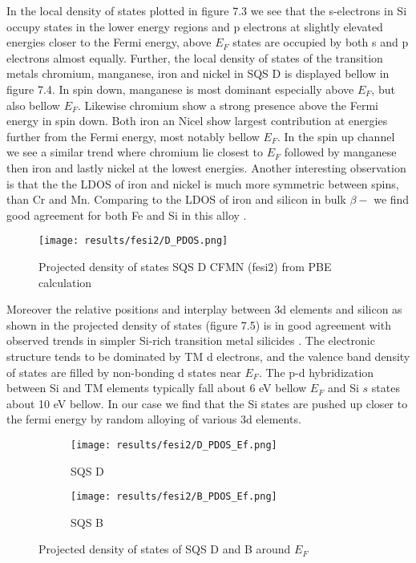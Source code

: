In the local density of states plotted in figure 7.3 we see that the s-electrons in Si occupy states in the lower energy regions and p electrons at slightly elevated energies closer to the Fermi energy, above $E_F$ states are occupied by both s and p electrons almost equally. Further, the local density of states of the transition metals chromium, manganese, iron and nickel in SQS D is displayed bellow in figure 7.4. In spin down, manganese is most dominant especially above $E_F$, but also bellow $E_F$. Likewise chromium show a strong presence above the Fermi energy in spin down. Both iron an Nicel show largest contribution at energies further from the Fermi energy, most notably bellow $E_F$. In the spin up channel we see a similar trend where chromium lie closest to $E_F$ followed by manganese then iron and lastly nickel at the lowest energies. Another interesting observation is that the the LDOS of iron and nickel is much more symmetric between spins, than Cr and Mn. Comparing to the LDOS of iron and silicon in bulk $\beta-$  \cite{doi:10.1063/1.346415} we find good agreement for both Fe and Si in this alloy .

\begin{figure}[H]
	\centering
	\texttt{[image: results/fesi2/D\_PDOS.png]}
	\caption{Projected density of states SQS D CFMN (fesi2) from PBE calculation}
\end{figure} 

Moreover the relative positions and interplay between 3d elements and silicon as shown in the projected density of states (figure 7.5) is in good agreement with observed trends in simpler Si-rich transition metal silicides \cite{lange1997electronic}. The electronic structure tends to be dominated by TM d electrons, and the valence band density of states are filled by non-bonding d states near $E_F$. The p-d hybridization between Si and TM elements typically fall about 6 eV bellow $E_F$ and Si $s$ states about 10 eV bellow. In our case we find that the Si states are pushed up closer to the fermi energy by random alloying of various 3d elements.    

  
\begin{figure}[H]
	\centering
	\begin{subfigure}{.45\textwidth}
			\texttt{[image: results/fesi2/D\_PDOS\_Ef.png]}
			\caption{SQS D}		
	\end{subfigure}
	\hspace{0.5cm}
	\begin{subfigure}{.45\textwidth}
		\texttt{[image: results/fesi2/B\_PDOS\_Ef.png]}
		\caption{SQS B}		
	\end{subfigure}
	\caption{Projected density of states of SQS D and B around $E_F$}
\end{figure}


